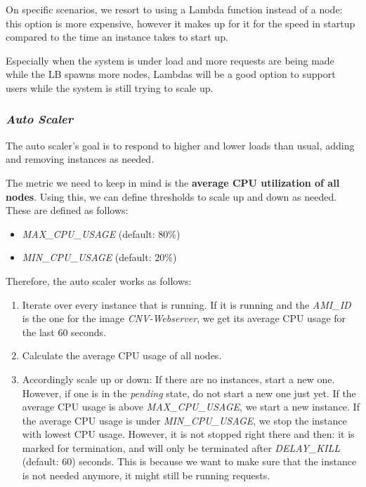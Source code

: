 \documentclass{article}
\begin{document}
On specific scenarios, we resort to using a Lambda function instead of a node:
this option is more expensive, however it makes up for it for the speed in
startup compared to the time an instance takes to start up.

Especially when the system is under load and more requests are being made while
the LB spawns more nodes, Lambdas will be a good option to support users while
the system is still trying to scale up.

\subsubsection{\textit{Auto Scaler}}

The auto scaler's goal is to respond to higher and lower loads than usual,
adding and removing instances as needed.

The metric we need to keep in mind is the \textbf{average CPU utilization of all
nodes}. Using this, we can define thresholds to scale up and down as needed.
These are defined as follows:

\begin{itemize}
    \item \textit{MAX\_CPU\_USAGE} (default: 80\%)
    \item \textit{MIN\_CPU\_USAGE} (default: 20\%)
\end{itemize}

Therefore, the auto scaler works as follows:

\begin{enumerate}
    \item Iterate over every instance that is running. If it is running and the
        \textit{AMI\_ID} is the one for the image \textit{CNV-Webserver}, we get
        its average CPU usage for the last 60 seconds.
    \item Calculate the average CPU usage of all nodes.
    \item Accordingly scale up or down:
        \subitem If there are no instances, start a new one. However, if one is
        in the \textit{pending} state, do not start a new one just yet.
        \subitem If the average CPU usage is above \textit{MAX\_CPU\_USAGE}, we
        start a new instance.
        \subitem If the average CPU usage is under \textit{MIN\_CPU\_USAGE}, we
        stop the instance with lowest CPU usage. However, it is not stopped
        right there and then: it is marked for termination, and will only be
        terminated after \textit{DELAY\_KILL} (default: 60) seconds. This is
        because we want to make sure that the instance is not needed anymore, it
        might still be running requests.
\end{enumerate}
\end{document}
